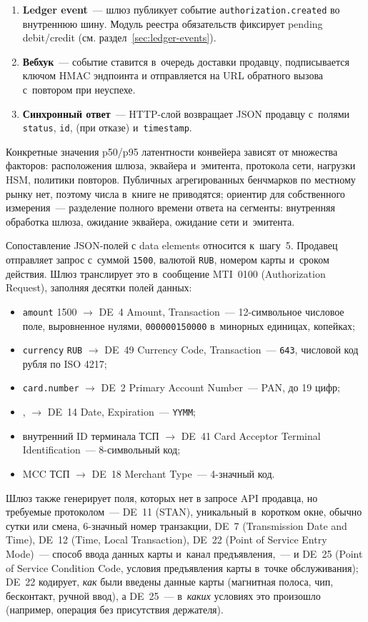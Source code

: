 \begin{enumerate}
    сохраняет результат и обновляет запись транзакции.
  \item \textbf{Ledger event}~--- шлюз публикует событие
    \texttt{authorization.created} во внутреннюю шину. Модуль
    реестра обязательств фиксирует pending debit/credit
    (см. раздел~\ref{sec:ledger-events}).
  \item \textbf{Вебхук}~--- событие ставится в~очередь доставки
    продавцу, подписывается ключом HMAC эндпоинта и отправляется
    на URL обратного вызова с~повтором при неуспехе.
  \item \textbf{Синхронный ответ}~--- HTTP-слой возвращает JSON
    продавцу с~полями \texttt{status}, \texttt{id},
     (при отказе) и~\texttt{timestamp}.
\end{enumerate}

Конкретные значения p50/p95 латентности конвейера зависят
от множества факторов: расположения шлюза, эквайера и~эмитента,
протокола сети, нагрузки HSM, политики повторов. Публичных
агрегированных бенчмарков по местному рынку нет, поэтому
числа в~книге не приводятся; ориентир для собственного
измерения~--- разделение полного времени ответа на сегменты:
внутренняя обработка шлюза, ожидание эквайера, ожидание
сети и~эмитента.

Сопоставление JSON-полей с data elements относится к~шагу~5.
Продавец отправляет запрос с~суммой \texttt{1500}, валютой
\texttt{RUB}, номером карты и~сроком действия. Шлюз транслирует
это в~сообщение MTI~0100 (Authorization Request), заполняя
десятки полей данных:

\begin{itemize}
  \item \texttt{amount} 1500 $\to$ DE~4 Amount, Transaction~---
    12-символьное числовое поле, выровненное нулями,
    \texttt{000000150000} в~минорных единицах, копейках;
  \item \texttt{currency} \texttt{RUB} $\to$ DE~49 Currency Code,
    Transaction~--- \texttt{643}, числовой код рубля по ISO 4217;
  \item \texttt{card.number} $\to$ DE~2 Primary Account Number~---
    PAN, до 19 цифр;
  \item {},  $\to$
    DE~14 Date, Expiration~--- \texttt{YYMM};
  \item внутренний ID терминала ТСП $\to$ DE~41 Card Acceptor
    Terminal Identification~--- 8-символьный код;
  \item MCC ТСП $\to$ DE~18 Merchant Type~--- 4-значный код.
\end{itemize}
Шлюз также генерирует поля, которых нет в запросе API
продавца, но требуемые протоколом~--- DE~11 (STAN), уникальный
в~коротком окне, обычно сутки или смена, 6-значный
номер транзакции, DE~7 (Transmission Date
and Time), DE~12 (Time, Local Transaction), DE~22 (Point
of Service Entry Mode)~--- способ ввода данных карты
и~канал предъявления,~--- и DE~25 (Point of Service Condition Code,
условия предъявления карты в~точке обслуживания); DE~22 кодирует,
\emph{как} были введены данные карты (магнитная полоса, чип,
бесконтакт, ручной ввод), а DE~25~--- в~\emph{каких} условиях это
произошло (например, операция без присутствия держателя).

